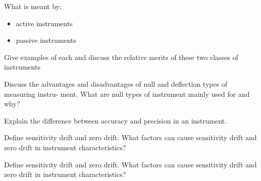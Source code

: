 \documentclass[a4paper,11pt,dvipsnames]{book}
\begin{document}
\begin{question}
What is meant by: \\
\begin{itemize}
\item active instruments 
\item passive instruments
\end{itemize}

Give examples of each and discuss the relative merits of these two classes of instruments
\examspace*{5em}

\end{question}
\begin{solution}


\end{solution}


\begin{question}
Discuss the advantages and disadvantages of null and deflection types of measuring instru-
ment. What are null types of instrument mainly used for and why?

\examspace*{5em}

\end{question}
\begin{solution}


\end{solution}


\begin{question}
Explain the difference between accuracy and precision in an instrument.

\examspace*{5em}

\end{question}
\begin{solution}


\end{solution}

\begin{question}
Define sensitivity drift and zero drift. What factors can cause sensitivity drift and zero drift
in instrument characteristics?
\examspace*{5em}

\end{question}
\begin{solution}


\end{solution}

\begin{question}
Define sensitivity drift and zero drift. What factors can cause sensitivity drift and zero drift
in instrument characteristics?
\examspace*{5em}

\end{question}
\begin{solution}


\end{solution}
\end{document}
